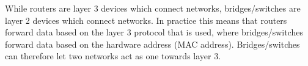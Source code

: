While routers are layer 3 devices which connect networks, bridges/switches are layer 2 devices which connect networks. In practice this means that routers forward data based on the layer 3 protocol that is used, where bridges/switches forward data based on the hardware address (MAC address). Bridges/switches can therefore let two networks act as one towards layer 3.